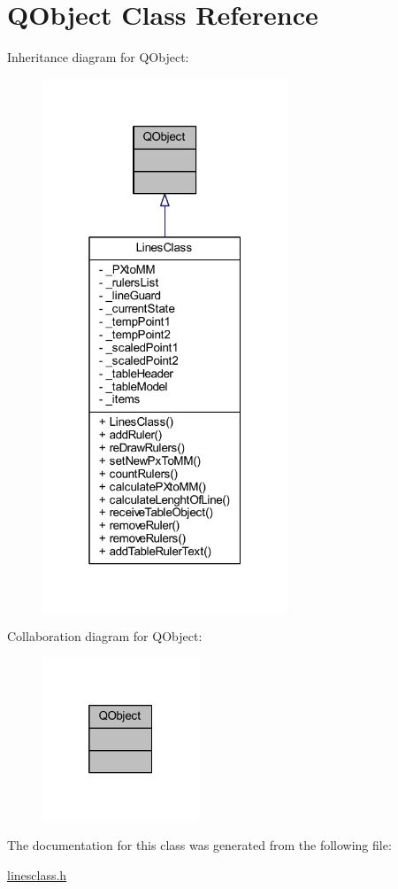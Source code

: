 \hypertarget{classQObject}{}\section{Q\+Object Class Reference}
\label{classQObject}


Inheritance diagram for Q\+Object\+:
\nopagebreak
\begin{figure}[H]
\begin{center}
\leavevmode
\includegraphics[width=208pt]{classQObject__inherit__graph}
\end{center}
\end{figure}


Collaboration diagram for Q\+Object\+:
\nopagebreak
\begin{figure}[H]
\begin{center}
\leavevmode
\includegraphics[width=133pt]{classQObject__coll__graph}
\end{center}
\end{figure}


The documentation for this class was generated from the following file\+:\begin{DoxyCompactItemize}
\item 
\mbox{\hyperlink{linesclass_8h}{linesclass.\+h}}\end{DoxyCompactItemize}
